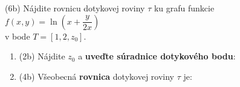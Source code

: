 \pr (6b) Nájdite rovnicu dotykovej roviny $\tau$ ku grafu funkcie
$\displaystyle f(x,y)=\ln\left(x+\dfrac{y}{2x}\right)$ \\
\hspace*{1.4cm} v bode $T=\left[1,2, z_{0}\right]$.

\begin{enumerate}
\item[] (2b) Nájdite $z_0$ a  \textbf{uveďte súradnice dotykového bodu}: \gr
\item[] (4b) Všeobecná \textbf{rovnica} dotykovej roviny $\tau$ je:\gr
\end{enumerate}
